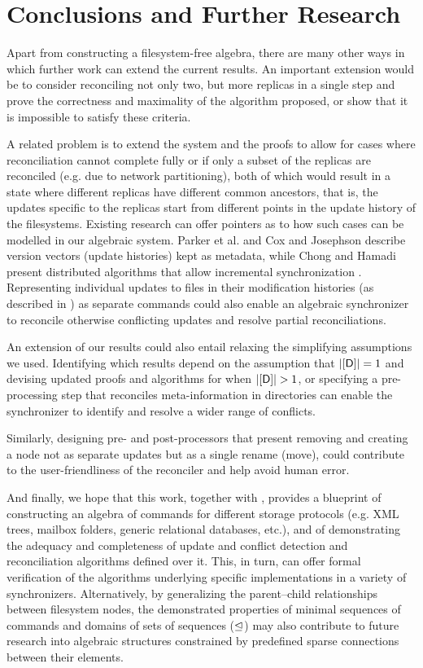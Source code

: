 
\section{Conclusions and Further Research}

Apart from constructing a filesystem-free algebra,
there are many other ways in which further work can extend the current results.
An important extension would be to
consider reconciling not only two, but more replicas in a single step and
prove the correctness and maximality of the algorithm proposed,
or show that it is impossible to satisfy these criteria.

A related problem is to extend the system and the proofs
to allow for cases where reconciliation cannot
complete fully
or if only a subset of the replicas are reconciled 
(e.g. due to network partitioning),
both of which would result in a state where different replicas
have different common ancestors, that is,
the updates specific to the replicas start from different points
in the update history of the filesystems.
Existing research can offer pointers as to how such cases can be modelled
in our algebraic system.
Parker et al. \cite{PPRS} and Cox and Josephson \cite{CJ}
describe version vectors (update histories) kept as metadata,
while Chong and Hamadi present distributed algorithms that allow incremental synchronization \cite{CH}.
Representing individual updates to files
in their modification histories (as described in \cite{CJ})
as separate commands could also enable an algebraic synchronizer to reconcile otherwise
conflicting updates and resolve partial reconciliations.

An extension of our results could also entail relaxing
the simplifying assumptions we used.
Identifying which results depend on the assumption that $|[\mathsf{D}]|=1$
and devising updated proofs and algorithms for when $|\setd|>1$,
or specifying a pre-processing step that reconciles meta-information in directories
can enable the synchronizer
to identify and resolve a wider range of conflicts.

Similarly, designing pre- and post-processors that
present removing and creating a node
not as separate updates but as a single rename (move),
could contribute to the user-friendliness of the reconciler
and help avoid human error.

And finally, we hope that this work, together with \cite{NREC}, provides
a blueprint of constructing an algebra of commands for different storage protocols
(e.g. XML trees, mailbox folders, generic relational databases, etc.),
and of demonstrating the adequacy and completeness of update and conflict detection and reconciliation
algorithms defined over it.
This, in turn, can offer formal verification of the algorithms underlying
specific implementations in a variety of synchronizers.
Alternatively, by generalizing the parent--child relationships between filesystem nodes,
the demonstrated properties of minimal sequences of commands
and domains of sets of sequences ($\trianglelefteq$)
may also contribute to future research into algebraic structures
constrained by predefined sparse connections between their elements.
